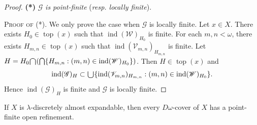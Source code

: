 \documentclass[main.tex]{subfiles}
\begin{document}
\begin{proof}
\textbf{(*)} $\mathscr{G}$ \textit{is point-finite} (\textit{resp. locally finite}).

\noindent\textsc{Proof of (*)}. We only prove the case when $\mathscr{G}$ is  locally finite. 
Let $x \in X$. There exists 
 $H_0\in \operatorname{top}(x)$
such that $\operatorname{ind}(\mathscr{W})_{H_0}$ is finite. For each $m, n < \omega$, 
there exists $H_{m,n}\in  \operatorname{top}(x)$ such that $\operatorname{ind}(\mathscr{V}_{m,n})_{H_{m,n}}$ is finite. 
Let $H = H_0 \raisebox{-2pt}{\scalebox{1.5}{$\cap$}}(\bigcap\{H_{m,n}:(m,n)\in \operatorname{ind}(\mathscr{W})_{H_0}\})$. 
Then $H\in\operatorname{top}(x)$ and
$$\operatorname{ind}(\mathscr{G})_H \subset 
\raisebox{-2pt}{\scalebox{1.5}{$\cup$}}\{\operatorname{ind}(\mathscr{V}_{m,n})_{H_{m,n}}: (m,n)
\in\operatorname{ind}(\mathscr{W})_{H_0}\}.$$ 
Hence $\operatorname{ind}(\mathscr{G})_H$ is finite and $\mathscr{G}$ is locally finite.
\end{proof}

{\lemma{} \label{lem:7.1.2}
If  $X$  is $\lambda$-discretely almost expandable, then
every $D\omega$-cover of  $X$  has a point-finite open refinement.
}
\end{document}
